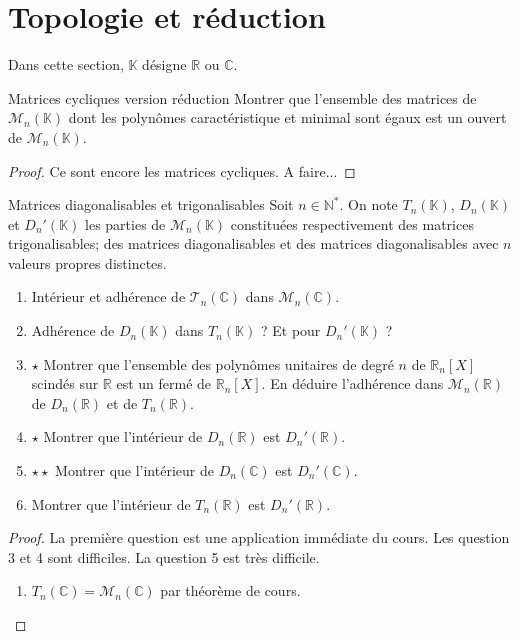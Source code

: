 \documentclass[french,a4paper]{article}
\newcommand{\N}{\mathbb{N}}
\newcommand{\R}{\mathbb{R}}
\newcommand{\C}{\mathbb{C}}
\newcommand{\K}{\mathbb{K}}
\newcommand{\st}{^*}
\theoremstyle{plain}
\theoremstyle{definition}
\theoremstyle{remark}
\begin{document}
\section{Topologie et réduction}

Dans cette section, $\K$ désigne $\R$ ou $\C$.

\begin{ex}[Moulin.55]{Matrices cycliques version réduction}
	Montrer que l'ensemble des matrices de $\mathcal{M}_n(\K)$ dont les polynômes caractéristique et minimal sont égaux est un ouvert de $\mathcal{M}_n(\K)$.
\end{ex}
\begin{proof}
	Ce sont encore les matrices cycliques. A faire...
\end{proof}

\begin{ex}[Moulin.56]{Matrices diagonalisables et trigonalisables}
	Soit $n\in\N\st$. On note $T_n(\K)$, $D_n(\K)$ et $D_n'(\K)$ les parties de $\mathcal{M}_n(\K)$ constituées respectivement des matrices trigonalisables; des matrices diagonalisables et des matrices diagonalisables avec $n$ valeurs propres distinctes.
	\begin{enumerate}
		\item Intérieur et adhérence de $\mathcal{T}_n(\C)$ dans $\mathcal{M}_n(\C)$.
		\item Adhérence de $D_n(\K)$ dans $T_n(\K)$ ? Et pour $D_n'(\K)$ ?
		\item $\star$ Montrer que l'ensemble des polynômes unitaires de degré $n$ de $\R_n[X]$ scindés sur $\R$ est un fermé de $\R_n[X]$. En déduire l'adhérence dans $\mathcal{M}_n(\R)$ de $D_n(\R)$ et de $T_n(\R)$.
		\item $\star$ Montrer que l'intérieur de $D_n(\R)$ est $D_n'(\R)$.
		\item $\star\star$ Montrer que l'intérieur de $D_n(\C)$ est $D_n'(\C)$.
		\item Montrer que l'intérieur de $T_n(\R)$ est $D_n'(\R)$.
	\end{enumerate}
\end{ex}
\begin{proof}
	La première question est une application immédiate du cours. Les question 3 et 4 sont difficiles. La question 5 est très difficile.
	\begin{enumerate}
		\item $T_n(\C)=\mathcal{M}_n(\C)$ par théorème de cours.
	\end{enumerate}
\end{proof}
\end{document}
